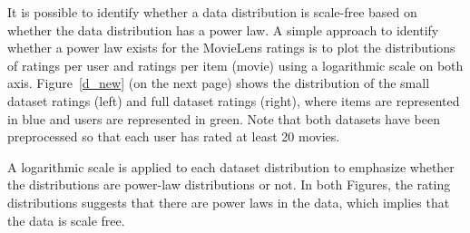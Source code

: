 \documentclass{article}
\begin{document}
It is possible to identify whether a data distribution is scale-free based on whether the data distribution has a 
power law. A simple approach to identify whether a power law exists for the MovieLens ratings is to plot the 
distributions of ratings per user and ratings per item (movie) using a logarithmic scale on both axis.
Figure~\ref{d_new} (on the next page) shows the distribution of the small dataset ratings (left) and full dataset ratings (right), 
where items are represented in blue and users are represented in green. Note that both datasets have been 
preprocessed so that each user has rated at least 20 movies.

A logarithmic scale is applied to each dataset distribution to emphasize whether the distributions 
are power-law distributions or not. In both Figures, the rating distributions suggests that there 
are power laws in the data, which implies that the data is scale free.

\newpage
\end{document}
